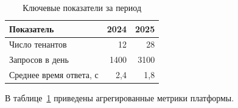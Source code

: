 \begin{table}[H]
  \centering
  \caption{Ключевые показатели за период}
  \label{tab:kpi}
  \begin{tabular}{lrr}
    \toprule
    Показатель & 2024 & 2025 \\
    \midrule
    Число тенантов & 12 & 28 \\
    Запросов в день & 1400 & 3100 \\
    Среднее время ответа, с & 2{,}4 & 1{,}8 \\
    \bottomrule
  \end{tabular}
\end{table}

В таблице~\ref{tab:kpi} приведены агрегированные метрики платформы.
